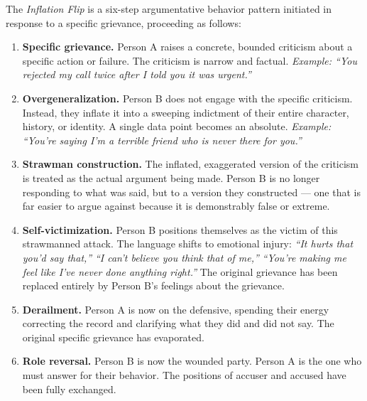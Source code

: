 \begin{definition}
The \emph{Inflation Flip} is a six-step argumentative behavior pattern initiated in response to a specific grievance, proceeding as follows:

\begin{enumerate}
  \item \textbf{Specific grievance.}
  Person A raises a concrete, bounded criticism about a specific action or failure.
  The criticism is narrow and factual.
  \emph{Example: ``You rejected my call twice after I told you it was urgent.''}

  \item \textbf{Overgeneralization.}
  Person B does not engage with the specific criticism.
  Instead, they inflate it into a sweeping indictment of their entire character, history, or identity.
  A single data point becomes an absolute.
  \emph{Example: ``You're saying I'm a terrible friend who is never there for you.''}

  \item \textbf{Strawman construction.}
  The inflated, exaggerated version of the criticism is treated as the actual argument being made.
  Person B is no longer responding to what was said, but to a version they constructed --- one that is far easier to argue against because it is demonstrably false or extreme.

  \item \textbf{Self-victimization.}
  Person B positions themselves as the victim of this strawmanned attack.
  The language shifts to emotional injury: \emph{``It hurts that you'd say that,''} \emph{``I can't believe you think that of me,''} \emph{``You're making me feel like I've never done anything right.''}
  The original grievance has been replaced entirely by Person B's feelings about the grievance.

  \item \textbf{Derailment.}
  Person A is now on the defensive, spending their energy correcting the record and clarifying what they did and did not say.
  The original specific grievance has evaporated.

  \item \textbf{Role reversal.}
  Person B is now the wounded party.
  Person A is the one who must answer for their behavior.
  The positions of accuser and accused have been fully exchanged.
\end{enumerate}
\end{definition}

